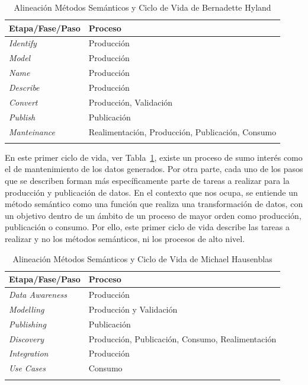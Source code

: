 \newpage

\begin{longtable}[c]{|p{6cm}|p{8cm}|} 

\hline

  \textbf{Etapa/Fase/Paso} &  \textbf{Proceso} \\\hline

\endhead
\textit{Identify} & Producción \\ \hline
\textit{Model} & Producción \\ \hline
\textit{Name} & Producción \\ \hline
\textit{Describe} & Producción \\ \hline
\textit{Convert} & Producción, Validación \\ \hline
\textit{Publish} & Publicación \\ \hline
\textit{Manteinance} & Realimentación, Producción, Publicación, Consumo \\ \hline
\hline
\caption{Alineación Métodos Semánticos y Ciclo de Vida de Bernadette Hyland}  \label{tabla:metodos-hyland}\\    
\end{longtable}

En este primer ciclo de vida, ver Tabla~\ref{tabla:metodos-hyland}, existe un proceso de sumo interés como el 
de mantenimiento de los datos generados. Por otra parte, cada uno de los pasos que se describen forman
más específicamente parte de tareas a realizar para la producción y publicación de datos. En el contexto que nos ocupa, 
se entiende un método semántico como una función que realiza una transformación de datos, con un objetivo dentro de un ámbito de un proceso de mayor orden como producción, publicación o consumo. Por ello, 
este primer ciclo de vida describe las tareas a realizar y no los métodos semánticos, ni los procesos de alto nivel.

\begin{longtable}[c]{|p{6cm}|p{8cm}|} 

\hline

  \textbf{Etapa/Fase/Paso} &  \textbf{Proceso} \\\hline

\endhead
\textit{Data Awareness} & Producción \\ \hline
\textit{Modelling} & Producción y Validación \\ \hline
\textit{Publishing} & Publicación \\ \hline
\textit{Discovery} & Producción, Publicación, Consumo, Realimentación \\ \hline
\textit{Integration} & Producción \\ \hline
\textit{Use Cases} & Consumo  \\ \hline
\hline
\caption{Alineación Métodos Semánticos y Ciclo de Vida de Michael Hausenblas}  \label{tabla:metodos-hausenblas}\\    
\end{longtable}

